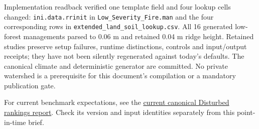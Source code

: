 Implementation readback verified one template field and four lookup cells
changed: \texttt{ini.data.rrinit} in \nolinkurl{Low_Severity_Fire.man}
and the four corresponding rows in \nolinkurl{extended_land_soil_lookup.csv}.
All 16 generated low-forest managements parsed to 0.06 m and retained
0.04 m ridge height. Retained studies preserve setup failures, runtime
distinctions, controls and input/output receipts; they have not been silently
regenerated against today's defaults. The canonical climate and deterministic
generator are committed. No private watershed is a prerequisite for this
document's compilation or a mandatory publication gate.

For current benchmark expectations, see the
\href{https://wepp.cloud/weppcloud/usersum/src/tests/disturbed/analysis_results_current.md}{current canonical Disturbed rankings report}.
Check its version and input identities separately from this point-in-time brief.
